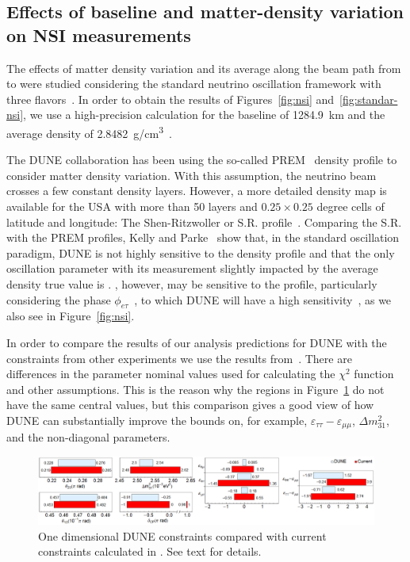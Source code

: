 \subsection{Effects of baseline and matter-density variation on  NSI measurements}\label{ssec:matter}
The effects of matter density variation and its average along the beam path from \fnal to \surf  were studied considering the standard neutrino oscillation framework with three flavors~\cite{Roe:2017zdw,Kelly:2018kmb}. In order to obtain the results of Figures~\ref{fig:nsi} and~\ref{fig:standar-nsi}, we use a high-precision calculation for the baseline of \SI{1284.9}{km} and the average density of \SI{2.8482}{g/cm^3}~\cite{Roe:2017zdw}.

The DUNE collaboration has been using the so-called PREM~\cite{Dziewonski:1981xy,PREM2} density profile to consider matter density variation. With this assumption, the neutrino beam crosses a few constant density layers.
However, a more detailed density map is available for the USA with more than 50 layers and $0.25 \times 0.25$ degree cells of latitude and longitude: The Shen-Ritzwoller or S.R. profile~\cite{SR:2016,Roe:2017zdw}. Comparing the S.R. with the PREM profiles, Kelly and Parke~\cite{Kelly:2018kmb} show that, in the standard oscillation paradigm, DUNE is not highly sensitive to the density profile and that the only oscillation parameter with its measurement slightly impacted by the average density true value is \deltacp{}.
, however, may be sensitive to the profile, particularly considering the phase $\phi_{e\tau}$~\cite{Chatterjee:2018dyd}, to which DUNE will have a high sensitivity~\cite{Ohlsson:2012kf,Miranda:2015dra,deGouvea:2015ndi,Coloma:2015kiu,Farzan:2017xzy}, as we also see in Figure~\ref{fig:nsi}.

In order to compare the results of our analysis predictions for DUNE with the constraints from other experiments we use the results from~\cite{Farzan:2017xzy}. There are differences in the parameter nominal values used for calculating the $\chi^2$ function and other assumptions. This is the reason why the regions in Figure~\ref{fig:bars} do not have the same central values, but this comparison gives a good view of how DUNE can substantially improve the bounds on, for example, $\varepsilon_{\tau\tau}-\varepsilon_{\mu\mu}$, $\Delta m^2_{31}$, and the non-diagonal  parameters.

\begin{figure}[!htb]
	\centering
    \includegraphics[width=1.0\columnwidth]{graphics/Barras_Geral_dune.png}
   \caption[]{\label{fig:bars} One dimensional DUNE constraints compared with current constraints calculated in \cite{Farzan:2017xzy}. See text for details.}
\end{figure}

